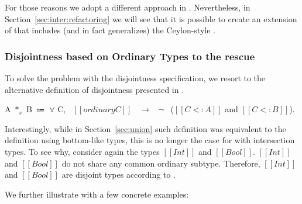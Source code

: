 For those reasons we adopt a different approach in \name.
Nevertheless, in Section~\ref{sec:inter:refactoring} we will see that it is possible to
create an extension of \name that includes (and in fact generalizes)
the Ceylon-style .

\subsubsection*{Disjointness based on Ordinary Types to the rescue}
To solve the problem with the disjointness specification, we resort to
the alternative definition of disjointness presented in .

\begin{definition}
\label{def:inter:disj}
  A $*_s$ B $\Coloneqq$ $\forall$ C, \ $[[ordinary C]]$ \ $\rightarrow$ \ $\neg$ \ ($[[C <: A]]$ and $[[C <: B]]$).
\end{definition}

Interestingly, while in Section~\ref{sec:union} such definition was
equivalent to the definition using bottom-like types, this is no
longer the case for \name with intersection types. To see why,
consider again the types $[[Int]]$ and $[[Bool]]$.  $[[Int]]$ and
$[[Bool]]$ do not share any common ordinary subtype. Therefore,
$[[Int]]$ and $[[Bool]]$ are disjoint types according to
.
\begin{comment}
We extend our previous example of type $[[Int]]$ and type $[[Bool]]$ and show how
disjointness based upon ordinary types categorize them as disjoint types.
An important observation at this point is common subtypes of type $[[Int]]$ and type $[[Bool]]$
cannot include either $[[Int]]$ or $[[Bool]]$. Problematic types are the intersection types
such as $[[Int /\ Bool]]$. We empahsize the point that ordinary types in \cal does not contain
intersection types. Further, all ordinary types are non-overlapping in \cal.
Therefore, now we say that
two types are disjoint if they do not have any common ordinary subtype. $[[Int]]$ and $[[Bool]]$
do not share any common ordinary subtype. Therefore, $[[Int]]$ and $[[Bool]]$ are disjoint types.
\Cref{def:inter:disj} shows the declarative disjointness for \cal with intersection types:


\noindent Two types $[[A]]$ and $[[B]]$ are
disjoint if the two types $[[A /\ B]]$ do
not have any common ordinary subtype. For example, $[[Int]]$ and $[[A -> B]]$
are disjoint types because there is no ordinary type that is a subtype
of both types ($[[Int]]$ and $[[A -> B]]$).
\Cref{def:inter:disj} is the same as 
\Cref{def:union:disj1}. However, while the \Cref{def:union:disj1} in \Cref{sec:union:discussion}
is equivalent the definition of disjointness using bottom-like types (\Cref{def:union:disj}),
in the calculus with intersection types that is no longer the case.
\end{comment}
We further illustrate  
 with a few concrete examples:

